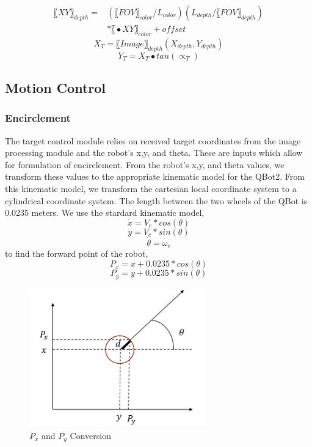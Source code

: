 \documentclass[conference]{IEEEtran}
\begin{document}
\begin{equation}
\begin{aligned}
〖XY〗_{depth}= & (〖FOV〗_{color}/L_{color} ) (L_{depth}/〖FOV〗_{depth} )  \\  & *〖∙XY〗_{color}+offset
\end{aligned}
\end{equation}
\begin{equation}
X_T=〖Image〗_{depth} (X_{depth},Y_{depth})
\end{equation}
\begin{equation}
Y_T=X_T∙tan⁡(∝_T)
\end{equation}
\subsection{Motion Control}
\subsubsection{Encirclement}
The target control module relies on received target coordinates from the image processing module and the robot’s  x,y, and theta. These are inputs which allow for formulation of encirclement.  From the robot’s x,y, and theta values, we transform these values to the appropriate kinematic model for the QBot2. From this kinematic model, we transform the cartesian local coordinate system to a cylindrical coordinate system. The length between the two wheels of the QBot is 0.0235 meters. We use the stardard kinematic model,
\begin{equation}
\dot{x}=V_c*cos⁡(\theta)
\end{equation}
\begin{equation}
\dot{y} =V_c*sin⁡(\theta)
\end{equation}
\begin{equation}
\dot\theta=\omega_c
\end{equation}
to find the forward point of the robot,
\begin{equation}
	P_x=x+0.0235*cos⁡(\theta)
\end{equation}
\begin{equation}
	P_y=y+0.0235*sin⁡(\theta)
\end{equation}

\begin{figure}[htbp] %
     \centering
     \includegraphics[width=3in]{7b.png} 
     \caption{$P_x$ and $P_y$ Conversion}
     \label{fig:7b}
  \end{figure}     
\end{document}
